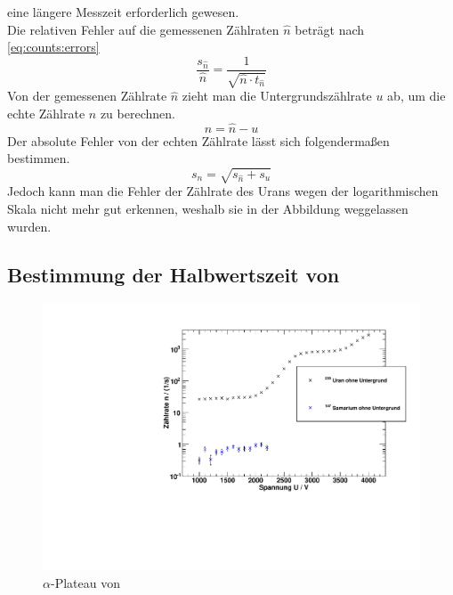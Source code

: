 eine längere Messzeit erforderlich gewesen. \\
Die relativen Fehler auf die gemessenen Zählraten $\hat{n}$ beträgt nach \autoref{eq:counts:errors}
\begin{equation}
  \frac{s_{\hat{n}}}{\hat{n}} = \frac{1}{\sqrt{\hat{n} \cdot t_{\hat{n}}}}
\end{equation}
Von der gemessenen Zählrate $\hat{n}$ zieht man die Untergrundszählrate $u$ ab, um die echte Zählrate $n$ zu berechnen.
\begin{equation}
  n = \hat{n} - u
\end{equation}
Der absolute Fehler von der echten Zählrate lässt sich folgendermaßen bestimmen.
\begin{equation}
  s_n = \sqrt{s_{\hat{n}} + s_u}
\end{equation}
Jedoch kann man die Fehler der Zählrate des Urans wegen der logarithmischen Skala nicht mehr gut erkennen, weshalb sie in der Abbildung 
weggelassen wurden.

\subsection{Bestimmung der Halbwertszeit von \samarium}
\begin{figure}[H]
\begin{center}
  \includegraphics[width=15cm]{../img/Samarium147_Charakteristik.pdf}
  \caption[$\alpha$-Plateau mit \samarium]{$\alpha$-Plateau von \samarium} %
  \label{img:char:samarium}
\end{center}
\end{figure}

